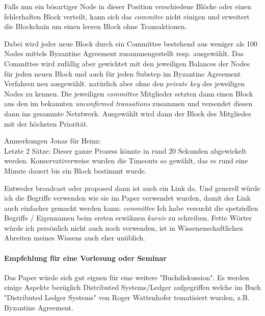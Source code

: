 \documentclass[11pt,a4paper]{article}
\begin{document}
Falls nun ein b\"osartiger Node in dieser Position verschiedene Bl\"ocke oder einen fehlerhaften Block
verteilt, kann sich das \textit{commitee} nicht einigen und erweitert die Blockchain um einen leeren Block ohne Transaktionen.

Dabei wird jeder neue Block durch ein Committee bestehend aus weniger als 100 Nodes mittels Byzantine Agreement zusammengestellt resp. ausgew\"ahlt.
Das Committee wird zuf\"allig aber gewichtet mit den jeweiligen Balances der Nodes f\"ur jeden neuen Block und auch f\"ur jeden Substep im Byzantine Agreement Verfahren neu ausgew\"ahlt.
nat\"urlich aber ohne den \textit{private key} des jeweiligen Nodes zu kennen.
Die jeweiligen \textit{committee} Mitglieder setzten dann einen Block aus den im bekannten \textit{unconfirmed transations} zusammen und versendet diesen dann ins gesammte Netztwerk.
Ausgew\"ahlt wird dann der Block des Mitgliedes mit der h\"ochsten Priorit\"at.

Anmerkungen Jonas f\"ur Heinz:\\
	Letzte 2 S\"atze:
	Dieser ganze Prozess k\"onnte in rund 20 Sekunden abgewickelt werden.
	Konservativerweise wurden die Timeouts so gew\"ahlt, das es rund eine Minute dauert bis ein Block bestimmt wurde.

	Entweder broadcast oder proposed dann ist auch ein Link da.
	Und generell w\"urde ich die Begriffe verwenden wie sie im Paper verwendet wurden, damit der Link auch einfacher gemacht werden kann:
		\textit{committee}
	Ich habe versucht die spetziellen Begriffe / Eigennamen beim ersten erwähnen \textit{kursiv} zu schreiben.
	Fette Wörter würde ich persönlich nicht auch noch verwenden, ist in Wissenenschaftlichen Abreiten meines Wissens auch eher unüblich.


\paragraph*{Empfehlung f\"ur eine Vorlesung oder Seminar}
Das Paper \cite{Gilad:2017:ASB:3132747.3132757} w\"urde sich gut eignen f\"ur eine weitere "Buchdiskussion".
Es werden einige Aspekte bez\"uglich Distributed Systems/Ledger aufgegriffen welche
im Buch "Distributed Ledger Systems" von Roger Wattenhofer tematisiert wurden, z.B. Byzantine Agreement.

\cite{Gilad:2017:ASB:3132747.3132757}
\cite{Chen:2017}


\end{document}
